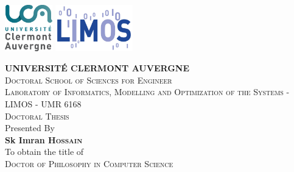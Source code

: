 \begin{titlepage}

	\begin{center}
		\begin{minipage}[t]{\textwidth}
			\includegraphics[height=2cm]{images/logo-uca.png}\hfill
			\includegraphics[height=2cm]{images/logo-limos.png}
		\end{minipage}%

		\vspace{0.6cm}
		\LARGE \textsc{\textbf{UNIVERSITÉ CLERMONT AUVERGNE}}\\
		\vspace{0.4cm}
		\normalsize \textsc{Doctoral School of Sciences for Engineer}\\
		\vspace{0.4cm}
		\normalsize \textsc{Laboratory of Informatics, Modelling and Optimization of the Systems - LIMOS - UMR 6168}\\

		\vspace{0.4cm}
		\Large \textsc{Doctoral Thesis}\\
		\vspace{0.4cm}
		\normalsize Presented By \\
		\LARGE \textbf{Sk Imran \textsc{Hossain}}\\
		\vspace{0.4cm}
		\normalsize To obtain the title of\\
		\Large \textsc{Doctor of Philosophy in Computer Science}


\end{center}
\end{titlepage}
